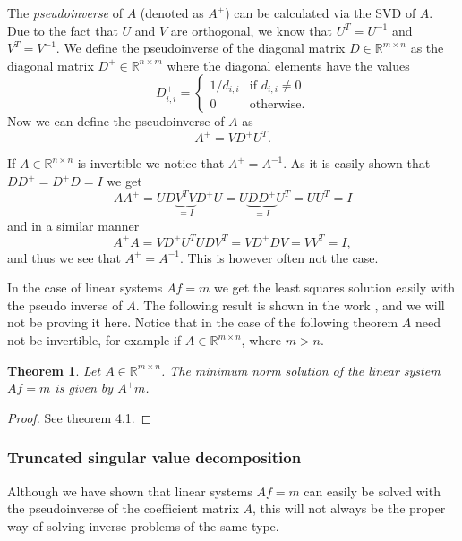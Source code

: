 \documentclass[12pt,a4]{article}
\newcommand{\R}{{\mathbb R}}
\newtheorem{theorem}{Theorem}
\begin{document}
The \emph{pseudoinverse} of $A$ (denoted as $A^+$) can be calculated via the SVD of $A$. Due to the fact that $U$ and $V$ are orthogonal, we know that $U^T = U^{-1}$ and $V^T = V^{-1}$. We define the pseudoinverse of the diagonal matrix $D \in \R^{m \times n}$ as the diagonal matrix $D^+ \in \R^{n \times m}$ where the diagonal elements have the values
\begin{equation}
D^+_{i,i} =
\begin{cases}
    1 / d_{i,i} & \text{if }d_{i,i} \neq 0 \\
    0           & \text{otherwise}.
\end{cases}
\end{equation}
Now we can define the pseudoinverse of $A$ as 
\begin{equation}\label{pseudo}
A^+ = V D^+ U^T .
\end{equation}

If $A \in \R^{n \times n}$ is invertible we notice that $A^+ = A^{-1}$. As it is easily shown that $D D^+ = D^+ D = I$ we get
\begin{equation}
A A^+ = U D \underbrace{V^T V}_{= I}  D^+ U = U \underbrace{D D^+}_{= I} U^T = U U^T = I
\end{equation}
and in a similar manner
\begin{equation}
A^+ A = V D^+ U^T U D V^T = V D^+ D V = V V^T = I ,
\end{equation}
and thus we see that $A^+ = A^{-1}$. This is however often not the case.

In the case of linear systems $Af = m$ we get the least squares solution easily with the pseudo inverse of $A$. The following result is shown in the work \cite{samu}, and we will not be proving it here. Notice that in the case of the following theorem $A$ need not be invertible, for example if $A \in \R^{m \times n}$, where $m > n$.

\begin{theorem}
Let $A \in \R^{m \times n}$. The minimum norm solution of the linear system $Af = m$ is given by $A^+ m$.
\end{theorem}
\begin{proof}
See \cite{samu} theorem 4.1.
\end{proof}


\subsubsection{Truncated singular value decomposition}

Although we have shown that linear systems $Af = m$ can easily be solved with the pseudoinverse of the coefficient matrix $A$, this will not always be the proper way of solving inverse problems of the same type.
\end{document}
